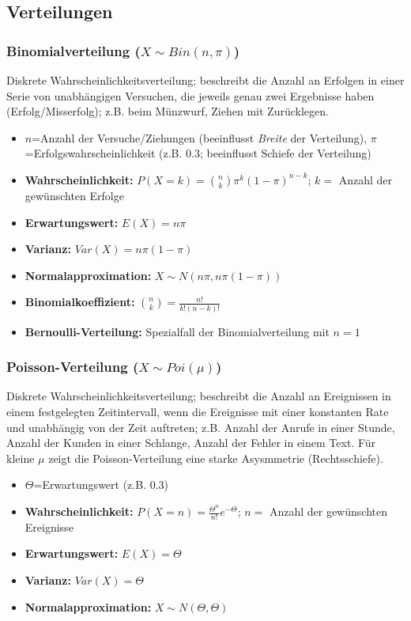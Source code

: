 \subsection{Verteilungen}
\label{verteilungen}

\subsubsection{Binomialverteilung (\(X\sim Bin(n,\pi)\))}
Diskrete Wahrscheinlichkeitsverteilung; beschreibt die Anzahl an Erfolgen in einer Serie von unabhängigen Versuchen, die jeweils genau zwei Ergebnisse haben (Erfolg/Misserfolg); z.B. beim Münzwurf, Ziehen mit Zurücklegen.

\begin{itemize}
    \item \(n\)=Anzahl der Versuche/Ziehungen (beeinflusst \emph{Breite} der Verteilung), \(\pi\)=Erfolgswahrscheinlichkeit (z.B. \(0.3\); beeinflusst Schiefe der Verteilung)
    \item \textbf{Wahrscheinlichkeit:} \(P(X=k)=\binom{n}{k}\pi^k(1-\pi)^{n-k}\); \(k=\) Anzahl der gewünschten Erfolge
    \item \textbf{Erwartungswert:} \(E(X)=n\pi\)
    \item \textbf{Varianz:} \(Var(X)=n\pi(1-\pi)\)
    \item \textbf{Normalapproximation:} \(X\sim N(n\pi, n\pi(1-\pi))\)
    \item \textbf{Binomialkoeffizient:} \(\binom{n}{k}=\frac{n!}{k!(n-k)!}\)
    \item \textbf{Bernoulli-Verteilung:} Spezialfall der Binomialverteilung mit \(n=1\)
\end{itemize}


\subsubsection{Poisson-Verteilung (\(X\sim Poi(\mu)\))}
Diskrete Wahrscheinlichkeitsverteilung; beschreibt die Anzahl an Ereignissen in einem festgelegten Zeitintervall, wenn die Ereignisse mit einer konstanten Rate und unabhängig von der Zeit auftreten; z.B. Anzahl der Anrufe in einer Stunde, Anzahl der Kunden in einer Schlange, Anzahl der Fehler in einem Text. Für kleine \(\mu\) zeigt die Poisson-Verteilung eine starke Asysmmetrie (Rechtsschiefe).

\begin{itemize}
    \item \(\varTheta \)=Erwartungswert (z.B. \(0.3\))
    \item \textbf{Wahrscheinlichkeit:} \(P(X=n)=\frac{\varTheta^n}{n!}e^{-\varTheta}\); \(n=\) Anzahl der gewünschten Ereignisse
    \item \textbf{Erwartungswert:} \(E(X)=\varTheta\)
    \item \textbf{Varianz:} \(Var(X)=\varTheta\)
    \item \textbf{Normalapproximation:} \(X\sim N(\varTheta, \varTheta)\)
\end{itemize}


